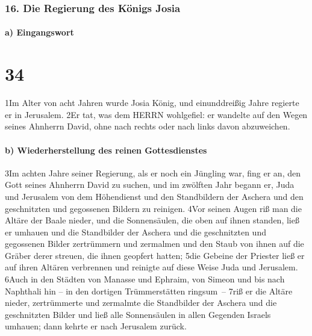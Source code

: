 \hypertarget{die-regierung-des-kuxf6nigs-josia}{%
\subsubsection{16. Die Regierung des Königs
Josia}\label{die-regierung-des-kuxf6nigs-josia}}

\hypertarget{a-eingangswort-1}{%
\paragraph{a) Eingangswort}\label{a-eingangswort-1}}

\hypertarget{section-33}{%
\section{34}\label{section-33}}

1Im Alter von acht Jahren wurde Josia König, und einunddreißig Jahre
regierte er in Jerusalem. 2Er tat, was dem HERRN wohlgefiel: er wandelte
auf den Wegen seines Ahnherrn David, ohne nach rechts oder nach links
davon abzuweichen.

\hypertarget{b-wiederherstellung-des-reinen-gottesdienstes}{%
\paragraph{b) Wiederherstellung des reinen
Gottesdienstes}\label{b-wiederherstellung-des-reinen-gottesdienstes}}

3Im achten Jahre seiner Regierung, als er noch ein Jüngling war, fing er
an, den Gott seines Ahnherrn David zu suchen, und im zwölften Jahr
begann er, Juda und Jerusalem von dem Höhendienst und den Standbildern
der Aschera und den geschnitzten und gegossenen Bildern zu reinigen.
4Vor seinen Augen riß man die Altäre der Baale nieder, und die
Sonnensäulen, die oben auf ihnen standen, ließ er umhauen und die
Standbilder der Aschera und die geschnitzten und gegossenen Bilder
zertrümmern und zermalmen und den Staub von ihnen auf die Gräber derer
streuen, die ihnen geopfert hatten; 5die Gebeine der Priester ließ er
auf ihren Altären verbrennen und reinigte auf diese Weise Juda und
Jerusalem. 6Auch in den Städten von Manasse und Ephraim, von Simeon und
bis nach Naphthali hin -- in den dortigen Trümmerstätten ringsum~-- 7riß
er die Altäre nieder, zertrümmerte und zermalmte die Standbilder der
Aschera und die geschnitzten Bilder und ließ alle Sonnensäulen in allen
Gegenden Israels umhauen; dann kehrte er nach Jerusalem zurück.

